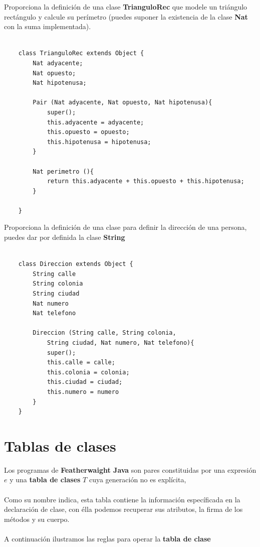 \begin{exercise}
    Proporciona la definición de una clase \textbf{TrianguloRec} que modele un triángulo rectángulo y calcule su perímetro (puedes suponer la existencia de la clase \textbf{Nat} con la suma implementada). 
    \begin{verbatim}
    
    class TrianguloRec extends Object {
        Nat adyacente;
        Nat opuesto;
        Nat hipotenusa;
    
        Pair (Nat adyacente, Nat opuesto, Nat hipotenusa){
            super();
            this.adyacente = adyacente;
            this.opuesto = opuesto;
            this.hipotenusa = hipotenusa;
        }
    
        Nat perimetro (){
            return this.adyacente + this.opuesto + this.hipotenusa;
        }
    
    }
    \end{verbatim}
\end{exercise}

\bigskip

\begin{exercise}
    Proporciona la definición de una clase para definir la dirección de una persona, puedes dar por definida la clase \textbf{String}
    \begin{verbatim}
    
    class Direccion extends Object {
        String calle
        String colonia
        String ciudad
        Nat numero
        Nat telefono
    
        Direccion (String calle, String colonia, 
            String ciudad, Nat numero, Nat telefono){
            super();
            this.calle = calle;
            this.colonia = colonia;
            this.ciudad = ciudad;
            this.numero = numero
        }
    }
    \end{verbatim}
    
\end{exercise}

\section{Tablas de clases}

Los programas de \textbf{Featherwaight Java} son pares constituidas por una expresión $e$ y una \textbf{tabla de clases} $T$ cuya generación no es explícita, \\\\
Como su nombre indica, esta tabla contiene la información específicada en la declaración de clase, con élla podemos recuperar sus atributos, la firma de los métodos y su cuerpo.\\\\
A continuación ilustramos las reglas para operar la \textbf{tabla de clase}

